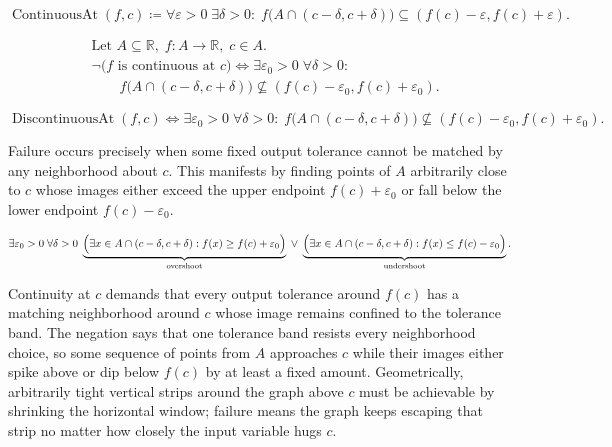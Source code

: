 \begin{remark*}
\[
\operatorname{ContinuousAt}(f,c) \coloneqq \forall \varepsilon > 0\; \exists \delta > 0:\; f\bigl(A \cap (c-\delta, c+\delta)\bigr) \subseteq (f(c)-\varepsilon, f(c)+\varepsilon).
\]
\end{remark*}

\begin{remark*}
\[
\begin{aligned}
&\text{Let } A \subseteq \mathbb{R},\; f:A \to \mathbb{R},\; c \in A.\\
&\neg\bigl(f \text{ is continuous at } c\bigr) \Longleftrightarrow \exists \varepsilon_{0} > 0\; \forall \delta > 0:\\
&\qquad f\bigl(A \cap (c-\delta, c+\delta)\bigr) \nsubseteq (f(c)-\varepsilon_{0}, f(c)+\varepsilon_{0}).
\end{aligned}
\]
\end{remark*}

\begin{remark*}
\[
\operatorname{DiscontinuousAt}(f,c) \Longleftrightarrow \exists \varepsilon_{0} > 0\; \forall \delta > 0:\; f\bigl(A \cap (c-\delta, c+\delta)\bigr) \nsubseteq (f(c)-\varepsilon_{0}, f(c)+\varepsilon_{0}).
\]
\end{remark*}

\begin{remark*}
Failure occurs precisely when some fixed output tolerance cannot be matched by any neighborhood about $c$. This manifests by finding points of $A$ arbitrarily close to $c$ whose images either exceed the upper endpoint $f(c)+\varepsilon_{0}$ or fall below the lower endpoint $f(c)-\varepsilon_{0}$.
\end{remark*}

\begin{remark*}
\[
\exists \varepsilon_{0} > 0\; \forall \delta > 0\;
\underbrace{\Bigl(
\exists x \in A \cap (c-\delta,c+\delta): f(x) \ge f(c)+\varepsilon_{0}
\Bigr)}_{\text{overshoot}}
\;\lor\;
\underbrace{\Bigl(
\exists x \in A \cap (c-\delta,c+\delta): f(x) \le f(c)-\varepsilon_{0}
\Bigr)}_{\text{undershoot}}.
\]
\end{remark*}

\begin{remark*}[Interpretation]
Continuity at $c$ demands that every output tolerance around $f(c)$ has a matching neighborhood around $c$ whose image remains confined to the tolerance band. The negation says that one tolerance band resists every neighborhood choice, so some sequence of points from $A$ approaches $c$ while their images either spike above or dip below $f(c)$ by at least a fixed amount. Geometrically, arbitrarily tight vertical strips around the graph above $c$ must be achievable by shrinking the horizontal window; failure means the graph keeps escaping that strip no matter how closely the input variable hugs $c$.
\end{remark*}

